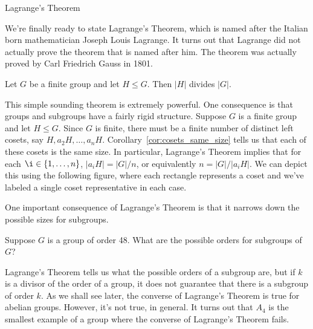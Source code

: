 \begin{section}{Lagrange's Theorem}

We're finally ready to state Lagrange's Theorem, which is named after the Italian born mathematician Joseph Louis Lagrange.  It turns out that Lagrange did not actually prove the theorem that is named after him.  The theorem was actually proved by Carl Friedrich Gauss in 1801.

\begin{theorem}
Let $G$ be a finite group and let $H\leq G$.  Then $|H|$ divides $|G|$.
\end{theorem}

This simple sounding theorem is extremely powerful.  One consequence is that groups and subgroups have a fairly rigid structure.  Suppose $G$ is a finite group and let $H\leq G$.  Since $G$ is finite, there must be a finite number of distinct left cosets, say $H, a_2H, \ldots, a_{n}H$.  Corollary~\ref{cor:cosets_same_size} tells us that each of these cosets is the same size.  In particular, Lagrange's Theorem implies that for each $\i\in\{1,\ldots, n\}$, $|a_iH|=|G|/n$, or equivalently $n=|G|/|a_iH|$.  We can depict this using the following figure, where each rectangle represents a coset and we've labeled a single coset representative in each case.

\begin{center}
\end{center}

One important consequence of Lagrange's Theorem is that it narrows down the possible sizes for subgroups.

\begin{exercise}
Suppose $G$ is a group of order 48.  What are the possible orders for subgroups of $G$?  
\end{exercise}

Lagrange's Theorem tells us what the possible orders of a subgroup are, but if $k$ is a divisor of the order of a group, it does not guarantee that there is a subgroup of order $k$.  As we shall see later, the converse of Lagrange's Theorem is true for abelian groups.  However, it's not true, in general.  It turns out that $A_4$ is the smallest example of a group where the converse of Lagrange's Theorem fails.


\end{section}
